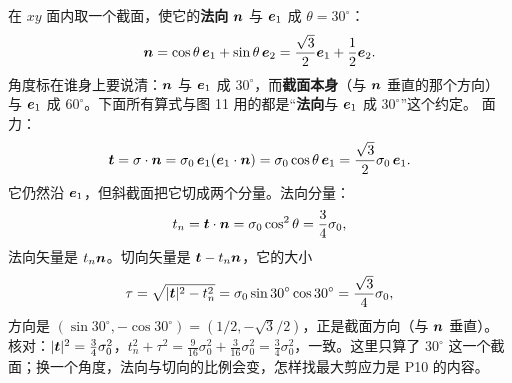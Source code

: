 \documentclass[11pt]{ctexart}
\newcommand{\ten}[1]{\mathbf{#1}}
\begin{document}
在 $xy$ 面内取一个截面，使它的\textbf{法向} $\boldsymbol{n}$ 与 $\boldsymbol{e}_1$ 成 $\theta=30^\circ$：
\[
\boldsymbol{n}=\cos\theta\,\boldsymbol{e}_1+\sin\theta\,\boldsymbol{e}_2=\frac{\sqrt3}{2}\boldsymbol{e}_1+\frac12\boldsymbol{e}_2 .
\]
角度标在谁身上要说清：$\boldsymbol{n}$ 与 $\boldsymbol{e}_1$ 成 $30^\circ$，而\textbf{截面本身}（与 $\boldsymbol{n}$ 垂直的那个方向）与 $\boldsymbol{e}_1$ 成 $60^\circ$。下面所有算式与图 11 用的都是“\textbf{法向}与 $\boldsymbol{e}_1$ 成 $30^\circ$”这个约定。
面力：
\[
\vect t=\ten\sigma\cdot\vect n
=\sigma_0\,\vect e_1(\vect e_1\cdot\vect n)
=\sigma_0\cos\theta\,\vect e_1
=\frac{\sqrt3}{2}\sigma_0\,\vect e_1 .
\]
它仍然沿 $\boldsymbol{e}_1$，但斜截面把它切成两个分量。法向分量：
\[
t_n=\boldsymbol{t}\cdot\boldsymbol{n}=\sigma_0\cos^2\theta=\frac34\sigma_0,
\]
法向矢量是 $t_n\boldsymbol{n}$。切向矢量是 $\boldsymbol{t}-t_n\boldsymbol{n}$，它的大小
\[
\tau=\sqrt{|\boldsymbol{t}|^2-t_n^2}
=\sigma_0\sin30^\circ\cos30^\circ
=\frac{\sqrt3}{4}\sigma_0,
\]
方向是 $(\sin30^\circ,-\cos30^\circ)=(1/2,-\sqrt3/2)$，正是截面方向（与 $\boldsymbol{n}$ 垂直）。核对：$|\boldsymbol{t}|^2=\frac34\sigma_0^2$，$t_n^2+\tau^2=\frac{9}{16}\sigma_0^2+\frac{3}{16}\sigma_0^2=\frac34\sigma_0^2$，一致。这里只算了 $30^\circ$ 这一个截面；换一个角度，法向与切向的比例会变，怎样找最大剪应力是 P10 的内容。
\end{document}

